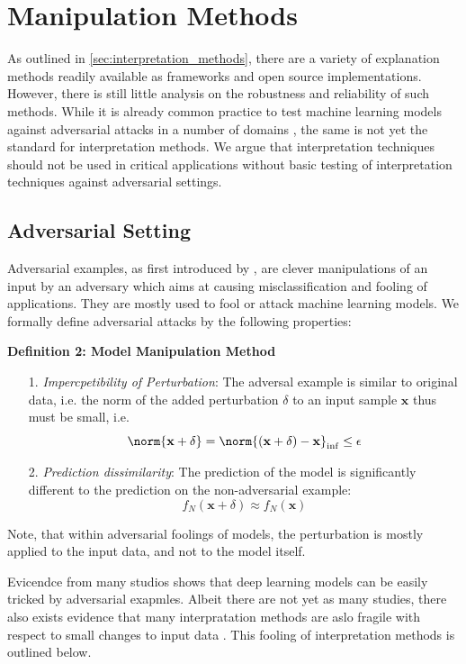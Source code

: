 \section{Manipulation Methods}
\label{sec:manipulation_methods}

As outlined in \autoref{sec:interpretation_methods}, there are a variety of explanation methods readily available as frameworks and open source implementations. However, there is still little analysis on the robustness and reliability of such methods. 
While it is already common practice to test machine learning models against adversarial attacks in a number of domains \cite{gao2019universal, kereliuk2015deep}, the same is not yet the standard for interpretation methods. We argue that interpretation techniques should not be used in critical applications without basic testing of interpretation techniques against adversarial settings.

\subsection{Adversarial Setting}
\label{subsec:adversarial_setting}
Adversarial examples, as first introduced by \cite{szegedy_intriguing}, are clever manipulations of an input by an adversary which aims at causing misclassification and fooling of applications. They are mostly used to fool or attack machine learning models. We formally define adversarial attacks by the following properties: 
\par\smallskip
\textbf{Definition 2: Model Manipulation Method}
\begin{enumerate}
    \item[1.] \textit{Impercpetibility of Perturbation}: The adversal example is similar to original data, i.e. the norm of the added perturbation $\delta$ to an input sample $\mathbf{x}$ thus must be small, i.e. $$\norm{\mathbf{x}+\delta} = \norm{(\mathbf{x}+\delta)-\mathbf{x}}_{\inf} \leq \epsilon$$
    \item[2.] \textit{Prediction dissimilarity}: The prediction of the model is significantly different to the prediction on the non-adversarial example: $$f_N(\mathbf{x}+\delta) \approx f_N(\mathbf{x})$$
\end{enumerate}
Note, that within adversarial foolings of models, the perturbation is mostly applied to the input data, and not to the model itself.

Evicendce from many studios shows that deep learning models can be easily tricked by adversarial exapmles. 
Albeit there are not yet as many studies, there also exists evidence that many interpratation methods are aslo fragile with respect to small changes to input data \cite{adebayo2018sanity, samek2019explainable, alvarez2018towards}. This fooling of interpretation methods is outlined below. 


